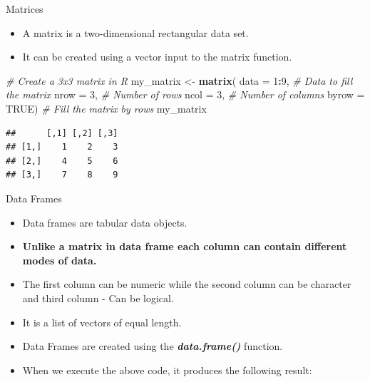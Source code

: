 \documentclass[
  ignorenonframetext,
]{beamer}
\newenvironment{Shaded}{\begin{snugshade}}{\end{snugshade}}
\newcommand{\AttributeTok}[1]{\textcolor[rgb]{0.13,0.29,0.53}{#1}}
\newcommand{\CommentTok}[1]{\textcolor[rgb]{0.56,0.35,0.01}{\textit{#1}}}
\newcommand{\ConstantTok}[1]{\textcolor[rgb]{0.56,0.35,0.01}{#1}}
\newcommand{\DecValTok}[1]{\textcolor[rgb]{0.00,0.00,0.81}{#1}}
\newcommand{\FunctionTok}[1]{\textcolor[rgb]{0.13,0.29,0.53}{\textbf{#1}}}
\newcommand{\NormalTok}[1]{#1}
\newcommand{\OtherTok}[1]{\textcolor[rgb]{0.56,0.35,0.01}{#1}}
\newcommand{\SpecialCharTok}[1]{\textcolor[rgb]{0.81,0.36,0.00}{\textbf{#1}}}
\providecommand{\tightlist}{%
  \setlength{\itemsep}{0pt}\setlength{\parskip}{0pt}}
\begin{document}
\begin{frame}[fragile]{Matrices}
\label{matrices}
\begin{itemize}
\tightlist
\item
  A matrix is a two-dimensional rectangular data set.
\item
  It can be created using a vector input to the matrix function.
\end{itemize}

\begin{Shaded}
\begin{Highlighting}[]
\CommentTok{\# Create a 3x3 matrix in R}
\NormalTok{my\_matrix }\OtherTok{\textless{}{-}} \FunctionTok{matrix}\NormalTok{(}
  \AttributeTok{data =} \DecValTok{1}\SpecialCharTok{:}\DecValTok{9}\NormalTok{,       }\CommentTok{\# Data to fill the matrix}
  \AttributeTok{nrow =} \DecValTok{3}\NormalTok{,         }\CommentTok{\# Number of rows}
  \AttributeTok{ncol =} \DecValTok{3}\NormalTok{,         }\CommentTok{\# Number of columns}
  \AttributeTok{byrow =} \ConstantTok{TRUE}\NormalTok{)      }\CommentTok{\# Fill the matrix by rows}
\NormalTok{my\_matrix}
\end{Highlighting}
\end{Shaded}

\begin{verbatim}
##      [,1] [,2] [,3]
## [1,]    1    2    3
## [2,]    4    5    6
## [3,]    7    8    9
\end{verbatim}
\end{frame}

\begin{frame}{Data Frames}
\label{data-frames}
\begin{itemize}
\tightlist
\item
  Data frames are tabular data objects.
\item
  \textbf{Unlike a matrix in data frame each column can contain
  different modes of data.}
\end{itemize}

\begin{itemize}
\tightlist
\item
  The first column can be numeric while the second column can be
  character and third column - Can be logical.
\end{itemize}

\begin{itemize}
\tightlist
\item
  It is a list of vectors of equal length.
\end{itemize}

\begin{itemize}
\tightlist
\item
  Data Frames are created using the \textbf{\emph{data.frame()}}
  function.
\end{itemize}

\begin{itemize}
\tightlist
\item
  When we execute the above code, it produces the following result:
\end{itemize}
\end{frame}
\end{document}
